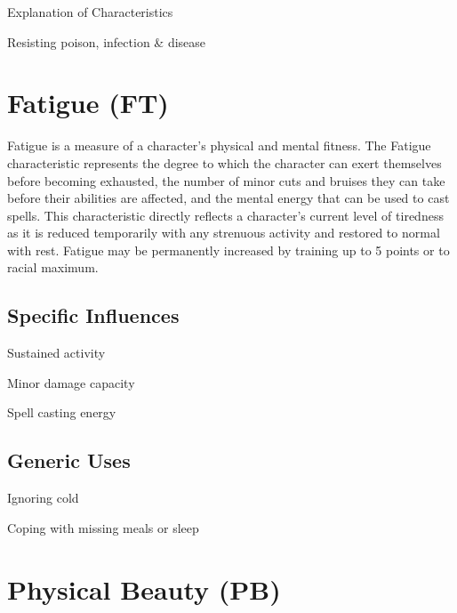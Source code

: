 \begin{Chapter}{Explanation of Characteristics}
\begin{Itemize}

\item Resisting poison, infection \& disease

\end{Itemize}

\section{Fatigue (FT)}

Fatigue is a measure of a character’s physical and mental fitness.
The Fatigue characteristic represents the degree to which the
character can exert themselves before becoming exhausted, the number
of minor cuts and bruises they can take before their abilities are
affected, and the mental energy that can be used to cast spells.  This
characteristic directly reflects a character’s current level of
tiredness as it is reduced temporarily with any strenuous activity and
restored to normal with rest.  Fatigue may be permanently increased by
training up to 5 points or to racial maximum.

\subsection{Specific Influences}

\begin{Itemize}

\item Sustained activity  

\item Minor damage capacity  

\item Spell casting energy 

\end{Itemize}

\subsection{Generic Uses}

\begin{Itemize}

\item Ignoring cold  

\item Coping with missing meals or sleep 

\end{Itemize}


\section{Physical Beauty (PB)}


\end{Chapter}
